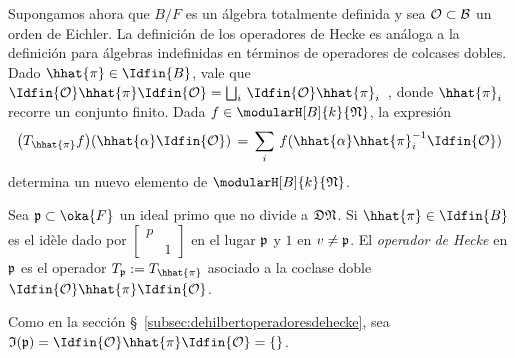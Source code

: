 Supongamos ahora que $B/F$ es un \'{a}lgebra totalmente definida y sea
$\cal{O}\subset B$ un orden de Eichler. La definici\'{o}n de los operadores de
Hecke es an\'{a}loga a la definici\'{o}n para \'{a}lgebras indefinidas en
t\'{e}rminos de operadores de colcases dobles. Dado $\hhat{\pi}\in\Idfin{B}$,
vale que
\begin{math}
	\Idfin{\cal{O}}\hhat{\pi}\Idfin{\cal{O}}=\bigsqcup_{i}\,
		\Idfin{\cal{O}}\hhat{\pi}_{i}
\end{math}~,
donde $\hhat{\pi}_{i}$ recorre un conjunto finito. Dada
$f\in\modularH[B]{k}{\frak{N}}$, la expresi\'{o}n
\begin{equation}
	\label{eq:heckeparadefinidos}
	\big(T_{\hhat{\pi}}f\big)(\hhat{\alpha}\Idfin{\cal{O}}) \,=\,
		\sum_{i}\,f(\hhat{\alpha}\hhat{\pi}_{i}^{-1}\Idfin{\cal{O}})
\end{equation}
%
determina un nuevo elemento de $\modularH[B]{k}{\frak{N}}$.

\begin{defHeckeParaDefinidos}\label{def:heckeparadefinidos}
	Sea $\frak{p}\subset\oka{F}$ un ideal primo que no divide a
	$\frak{D}\frak{N}$. Si $\hhat{\pi}\in\Idfin{B}$ es el id\`{e}le dado
	por
	\begin{math}
		\begin{bmatrix} p & \\ & 1 \end{bmatrix}
	\end{math}
	en el lugar $\frak{p}$ y $1$ en $v\not =\frak{p}$. El
	\emph{operador de Hecke} en $\frak{p}$ es el operador
	$T_{\frak{p}}:=T_{\hhat{\pi}}$ asociado a la coclase doble
	$\Idfin{\cal{O}}\hhat{\pi}\Idfin{\cal{O}}$.
\end{defHeckeParaDefinidos}

Como en la secci\'{o}n \S~\ref{subsec:dehilbertoperadoresdehecke}, sea
$\frak{I}(\frak{p})=\Idfin{\cal{O}}\hhat{\pi}\Idfin{\cal{O}}=\{\}$.

